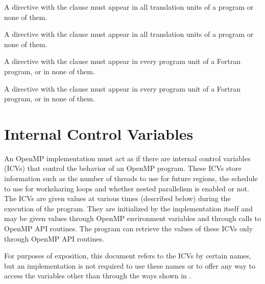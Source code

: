 \begin{itemize}

\begin{ccppspecific}
\item A  directive with the  clause must appear
       in all translation units of a program or none of them.
\item A  directive with the  clause must appear
       in all translation units of a program or none of them.
\end{ccppspecific}

\begin{fortranspecific}
\item A  directive with the  clause must appear
       in every program unit of a Fortran program, or in none of them.
\item A  directive with the  clause must appear
       in every program unit of a Fortran program, or in none of them.
\end{fortranspecific}

\end{itemize}


\section{Internal Control Variables}
\label{sec:Internal Control Variables}
An OpenMP implementation must act as if there are internal control variables (ICVs)
that control the behavior of an OpenMP program. These ICVs store information such as
the number of threads to use for future  regions, the schedule to use for
worksharing loops and whether nested parallelism is enabled or not. The ICVs are given
values at various times (described below) during the execution of the program. They are
initialized by the implementation itself and may be given values through OpenMP
environment variables and through calls to OpenMP API routines. The program can
retrieve the values of these ICVs only through OpenMP API routines.

For purposes of exposition, this document refers to the ICVs by certain names, but an
implementation is not required to use these names or to offer any way to access the
variables other than through the ways shown in
.








